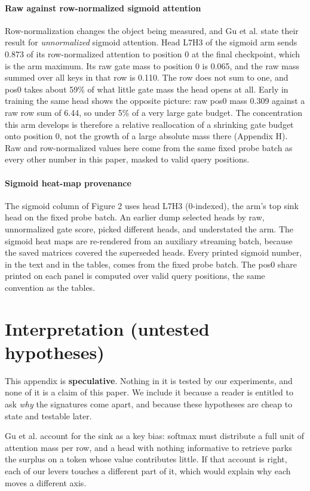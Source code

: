 \documentclass{article}
\begin{document}
\paragraph{Raw against row-normalized sigmoid attention} Row-normalization changes the object being measured, and Gu et al. \cite{ref6} state their result for \textit{unnormalized} sigmoid attention. Head L7H3 of the sigmoid arm sends 0.873 of its row-normalized attention to position 0 at the final checkpoint, which is the arm maximum. Its raw gate mass to position 0 is 0.065, and the raw mass summed over all keys in that row is 0.110. The row does not sum to one, and pos0 takes about 59\% of what little gate mass the head opens at all. Early in training the same head shows the opposite picture: raw pos0 mass 0.309 against a raw row sum of 6.44, so under 5\% of a very large gate budget. The concentration this arm develops is therefore a relative reallocation of a shrinking gate budget onto position 0, not the growth of a large absolute mass there (Appendix H). Raw and row-normalized values here come from the same fixed probe batch as every other number in this paper, masked to valid query positions.

\paragraph{Sigmoid heat-map provenance} The sigmoid column of Figure 2 uses head L7H3 (0-indexed), the arm's top sink head on the fixed probe batch. An earlier dump selected heads by raw, unnormalized gate score, picked different heads, and understated the arm. The sigmoid heat maps are re-rendered from an auxiliary streaming batch, because the saved matrices covered the superseded heads. Every printed sigmoid number, in the text and in the tables, comes from the fixed probe batch. The pos0 share printed on each panel is computed over valid query positions, the same convention as the tables.

\section{Interpretation (untested hypotheses)}

This appendix is \textbf{speculative}. Nothing in it is tested by our experiments, and none of it is a claim of this paper. We include it because a reader is entitled to ask \textit{why} the signatures come apart, and because these hypotheses are cheap to state and testable later.

Gu et al. \cite{ref6} account for the sink as a key bias: softmax must distribute a full unit of attention mass per row, and a head with nothing informative to retrieve parks the surplus on a token whose value contributes little. If that account is right, each of our levers touches a different part of it, which would explain why each moves a different axis.
\end{document}
